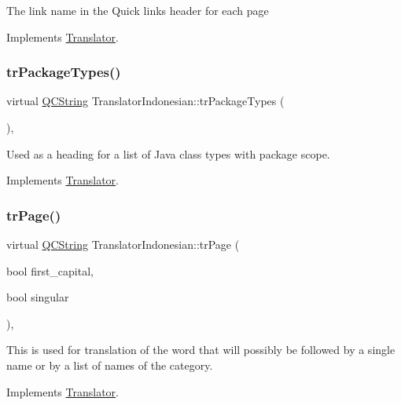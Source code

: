 The link name in the Quick links header for each page 

Implements \mbox{\hyperlink{class_translator}{Translator}}.

\mbox{\label{class_translator_indonesian_aca79d7c34f5fe0220c40428cece49261}} 
\subsubsection{\texorpdfstring{trPackageTypes()}{trPackageTypes()}}
{\footnotesize\ttfamily virtual \mbox{\hyperlink{class_q_c_string}{Q\+C\+String}} Translator\+Indonesian\+::tr\+Package\+Types (\begin{DoxyParamCaption}{ }\end{DoxyParamCaption})\hspace{0.3cm}{\ttfamily [inline]}, {\ttfamily [virtual]}}

Used as a heading for a list of Java class types with package scope. 

Implements \mbox{\hyperlink{class_translator}{Translator}}.

\mbox{\label{class_translator_indonesian_a2c851db6ed6b27e0ca60eeac9b33d39d}} 
\subsubsection{\texorpdfstring{trPage()}{trPage()}}
{\footnotesize\ttfamily virtual \mbox{\hyperlink{class_q_c_string}{Q\+C\+String}} Translator\+Indonesian\+::tr\+Page (\begin{DoxyParamCaption}\item[{bool}]{first\+\_\+capital,  }\item[{bool}]{singular }\end{DoxyParamCaption})\hspace{0.3cm}{\ttfamily [inline]}, {\ttfamily [virtual]}}

This is used for translation of the word that will possibly be followed by a single name or by a list of names of the category. 

Implements \mbox{\hyperlink{class_translator}{Translator}}.


